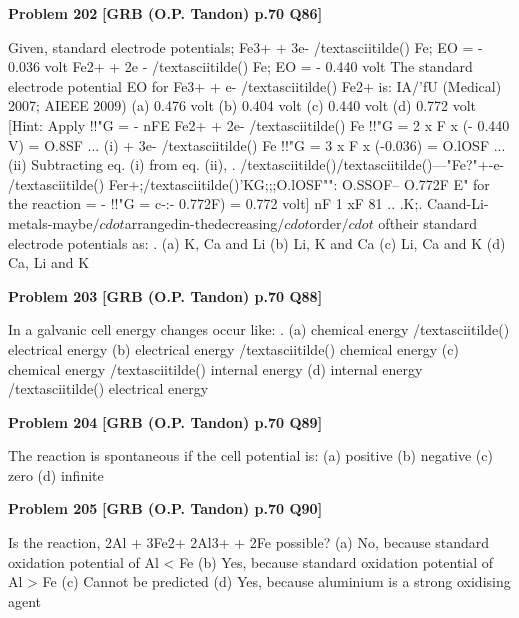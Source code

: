 \begin{problembox}
\textbf{Problem 202} \hfill \textbf{[GRB (O.P. Tandon) p.70 Q86]}
\label{q:ext-grb_all_questions-202}

Given, standard electrode potentials; 
Fe3+ + 3e- /textasciitilde() 
Fe; 
EO = - 0.036 volt 
Fe2+ + 2e - /textasciitilde() 
Fe; 
EO = - 0.440 volt 
The standard electrode potential EO for Fe3+ + e- /textasciitilde() 
Fe2+ 
is: 
IA/'fU (Medical) 2007; AIEEE 2009) 
(a) 
0.476 volt 
(b) 
0.404 volt 
(c) 0.440 volt 
(d) 
0.772 volt 
[Hint: Apply !!"G = - nFE 
Fe2+ + 2e- /textasciitilde() 
Fe !!"G = 
2 x F x (- 0.440 V) = O.8SF ... (i) 
+ 3e- /textasciitilde() 
Fe !!"G = 
3 x F x (-0.036) = O.lOSF 
... (ii) 
Subtracting eq. (i) from eq. (ii), 
. /textasciitilde()/textasciitilde()---"Fe?"+-e- /textasciitilde() 
Fer+;/textasciitilde()'KG;;;O.lOSF"": O.SSOF--
O.772F 
E" for the reaction = - !!"G = c-:- 0.772F) = 0.772 volt] 
nF 
1 xF 
81 .. .K;. Caand-Li-metals-maybe$/cdot$arrangedin-thedecreasing$/cdot$order$/cdot$ 
oftheir standard electrode potentials as: 
. 
(a) K, Ca and Li 
(b) Li, K and Ca 
(c) Li, Ca and K 
(d) Ca, Li and K
\end{problembox}

\begin{problembox}
\textbf{Problem 203} \hfill \textbf{[GRB (O.P. Tandon) p.70 Q88]}
\label{q:ext-grb_all_questions-203}

In a galvanic cell energy changes occur like: . 
(a) chemical energy /textasciitilde() 
electrical energy 
(b) electrical energy /textasciitilde() 
chemical energy 
(c) chemical energy /textasciitilde() 
internal energy 
(d) internal energy /textasciitilde() 
electrical energy
\end{problembox}

\begin{problembox}
\textbf{Problem 204} \hfill \textbf{[GRB (O.P. Tandon) p.70 Q89]}
\label{q:ext-grb_all_questions-204}

The reaction is spontaneous if the cell potential is: 
(a) positive 
(b) negative 
(c) zero 
(d) infinite
\end{problembox}

\begin{problembox}
\textbf{Problem 205} \hfill \textbf{[GRB (O.P. Tandon) p.70 Q90]}
\label{q:ext-grb_all_questions-205}

Is the reaction, 2Al + 3Fe2+ 
2Al3+ + 2Fe possible? 
(a) No, because standard oxidation potential of Al < Fe 
(b) Yes, because standard oxidation potential of Al > Fe 
(c) Cannot be predicted 
(d) Yes, because aluminium is a strong oxidising agent
\end{problembox}

